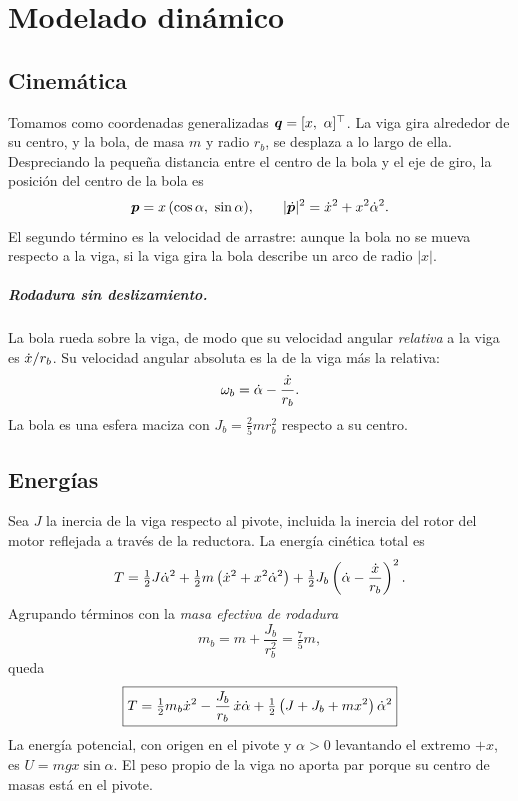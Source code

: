 \chapter{Modelado dinámico}
\label{cap:modelo}

\section{Cinemática}

Tomamos como coordenadas generalizadas $\bm{q}=[x,\ \alpha]^\top$. La viga gira alrededor de su centro, y la bola, de masa $m$ y radio $r_b$, se desplaza a lo largo de ella. Despreciando la pequeña distancia entre el centro de la bola y el eje de giro, la posición del centro de la bola es
\begin{equation}
  \bm{p} = x\,(\cos\alpha,\ \sin\alpha), \qquad |\dot{\bm{p}}|^2 = \dot{x}^2 + x^2\dot{\alpha}^2 .
\end{equation}
El segundo término es la velocidad de arrastre: aunque la bola no se mueva respecto a la viga, si la viga gira la bola describe un arco de radio $|x|$.

\paragraph{Rodadura sin deslizamiento.} La bola rueda sobre la viga, de modo que su velocidad angular \emph{relativa} a la viga es $\dot{x}/r_b$. Su velocidad angular absoluta es la de la viga más la relativa:
\begin{equation}
  \omega_b = \dot{\alpha} - \frac{\dot{x}}{r_b}.
\end{equation}
La bola es una esfera maciza con $J_b=\tfrac25 mr_b^2$ respecto a su centro.

\section{Energías}

Sea $J$ la inercia de la viga respecto al pivote, incluida la inercia del rotor del motor reflejada a través de la reductora. La energía cinética total es
\begin{equation}
  T = \tfrac12 J\dot{\alpha}^2 + \tfrac12 m\left(\dot{x}^2 + x^2\dot{\alpha}^2\right) + \tfrac12 J_b\left(\dot{\alpha} - \frac{\dot{x}}{r_b}\right)^2 .
\end{equation}
Agrupando términos con la \emph{masa efectiva de rodadura}
\begin{equation}
  m_b = m + \frac{J_b}{r_b^2} = \tfrac75 m,
  \label{eq:mb}
\end{equation}
queda
\begin{equation}
  \boxed{T = \tfrac12 m_b\dot{x}^2 - \frac{J_b}{r_b}\,\dot{x}\dot{\alpha} + \tfrac12\left(J + J_b + m x^2\right)\dot{\alpha}^2}
  \label{eq:T}
\end{equation}
La energía potencial, con origen en el pivote y $\alpha>0$ levantando el extremo $+x$, es $U = m g x\sin\alpha$. El peso propio de la viga no aporta par porque su centro de masas está en el pivote.

